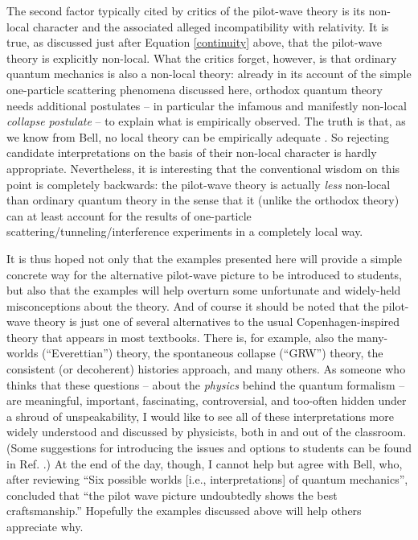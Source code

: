 \documentclass[aps,prc,onecolumn,letterpaper,floatfix,12pt]{revtex4}
\begin{document}
The second factor typically cited by critics of the pilot-wave theory
is its non-local character and the associated alleged incompatibility
with relativity. 
It is true, as discussed just after Equation \eqref{continuity} above,
that the pilot-wave theory is explicitly non-local.  What the critics
forget, however, is that ordinary quantum mechanics is also a
non-local theory:  already in its account of the simple one-particle 
scattering phenomena discussed here, orthodox quantum theory needs
additional postulates -- in particular the infamous and manifestly
non-local \emph{collapse postulate} -- to explain what is empirically
observed.  The truth is that, as we know from Bell, no local theory
can be empirically adequate  \cite{belltheorem}. So rejecting candidate
interpretations on the basis of their non-local character is
hardly appropriate.  Nevertheless, it is interesting that the
conventional wisdom on this point is completely backwards:  
the pilot-wave theory is actually \emph{less} non-local than ordinary
quantum theory in the sense that it (unlike the orthodox theory) can
at least account for the results of one-particle
scattering/tunneling/interference experiments in a completely local
way.  

It is thus hoped not only that the examples presented here will
provide a simple concrete way for the alternative pilot-wave picture
to be introduced to students, but also that the
examples will help overturn some unfortunate and widely-held 
misconceptions about the theory.  And of course it should be noted
that the pilot-wave theory is just one of several alternatives to the
usual Copenhagen-inspired theory that appears in most textbooks.
There is, for example, also the many-worlds (``Everettian'') theory,
the spontaneous collapse (``GRW'') theory, the consistent (or
decoherent) histories approach, and many others.   As
someone who thinks that these questions -- about the \emph{physics}
behind the quantum formalism -- are meaningful, important,
fascinating, controversial, and too-often hidden under a shroud of
unspeakability, I would like to see all of these interpretations more
widely understood and discussed by physicists, both in and out of the
classroom.  (Some suggestions for introducing the issues and options
to students can be found in Ref. .)
At the end of the day, though, I cannot help but agree with Bell, who,
after reviewing ``Six possible worlds [i.e., interpretations] of
quantum mechanics'', concluded that ``the pilot wave picture
undoubtedly shows the best craftsmanship.''  \cite{bell6}  Hopefully
the examples discussed above will help others appreciate why.
\end{document}
